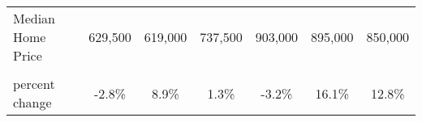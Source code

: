 \begin{table}
\begin{tabular}{lcccccc}
\addlinespace
Median Home Price & 629,500 & 619,000 & 737,500 & 903,000 & 895,000 & 850,000\\
\cellcolor{gray!10}{Median Home Price (\$2009)} & \cellcolor{gray!10}{477,019} & \cellcolor{gray!10}{519,367} & \cellcolor{gray!10}{526,218} & \cellcolor{gray!10}{509,578} & \cellcolor{gray!10}{591,570} & \cellcolor{gray!10}{667,484}\\
percent change & -2.8\% & 8.9\% & 1.3\% & -3.2\% & 16.1\% & 12.8\%\\
\bottomrule
\end{tabular}
\end{table}
